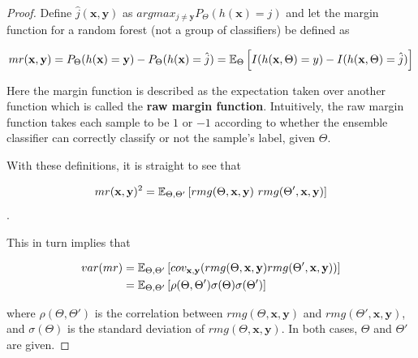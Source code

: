 \begin{proof}
Define $\hat{j}(\textbf{x},\textbf{y})$ as $arg max_{j\neq \textbf{y}} P_{\Theta}(h(\textbf{x}) = j)$ and let the margin function for a random forest (not a group of classifiers) be defined as

\begin{equation}\label{eq:rf-marginFunRf}
mr(\textbf{x},\textbf{y}) =  P_{\Theta}(h(\textbf{x}) = \textbf{y}) - P_{\Theta}(h(\textbf{x}) = \hat{j})
\\
= \operatorname{\mathbb{E}}_{\Theta} \left[  I(h(\textbf{x},\Theta ) = y ) - I( h( \textbf{x},\Theta ) = \hat{j} )  \right]
\end{equation}




Here the margin function is described as the expectation taken over another function which is called the \textbf{raw margin function}\label{eq:rf-rawMarginFun}. Intuitively, the raw margin function takes each sample to be $1$ or $-1$ according to whether the ensemble classifier can correctly classify or not the sample's label, given $\Theta$.

With these definitions, it is straight to see that

$$mr( \textbf{x},\textbf{y} )^2 = \Expect_{\Theta, \Theta'} \left[ rmg( \Theta,\textbf{x},\textbf{y} ) \ rmg(\Theta',\textbf{x},\textbf{y} )  \right] $$.

This in turn implies that

\begin{equation}\label{eq:rf-marginFunVar}
\begin{split}
var(mr) & =  \operatorname{\mathbb{E}}_{\Theta, \Theta'}
\left[
cov_{\textbf{x},\textbf{y}}
(rmg(\Theta,\textbf{x},\textbf{y} )rmg(\Theta',\textbf{x},\textbf{y} ))
\right] \\
& =  \operatorname{\mathbb{E}}_{\Theta, \Theta'}
\left[
\rho(\Theta, \Theta')\sigma(\Theta)\sigma(\Theta')
\right]
\end{split}
\end{equation}

where $ \rho(\Theta, \Theta')$ is the correlation between $rmg(\Theta,\textbf{x},\textbf{y})$ and $rmg(\Theta',\textbf{x},\textbf{y})$, and $\sigma(\Theta)$ is the standard deviation of $rmg(\Theta,\textbf{x},\textbf{y})$. In both cases, $\Theta$ and $\Theta'$ are given.%


\end{proof}
